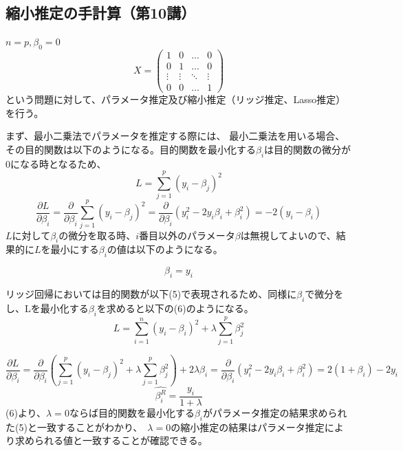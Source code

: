 \documentclass[uplatex]{jsarticle}
\begin{document}
\subsection{縮小推定の手計算（第10講）}
$n = p, \beta_0 = 0$
\[
  X = \left(
    \begin{array}{cccc}
      1 & 0 & \ldots & 0 \\
      0 & 1 & \ldots & 0 \\
      \vdots & \vdots & \ddots & \vdots \\
      0 & 0 & \ldots & 1
    \end{array}
  \right)
\]
という問題に対して、パラメータ推定及び縮小推定（リッジ推定、Lasso推定）を行う。

まず、最小二乗法でパラメータを推定する際には、
最小二乗法を用いる場合、その目的関数は以下のようになる。目的関数を最小化する$\beta_i$は目的関数の微分が0になる時となるため、
\begin{equation}
  L = \sum_{j = 1}^p(y_i - \beta_j)^2
\end{equation}
$$\frac{\partial L}{\partial \beta_i} = \frac{\partial}{\partial \beta_i}\sum_{j = 1}^p(y_i - \beta_j)^2 = \frac{\partial}{\partial \beta_i}(y_i^2 - 2y_i\beta_i + \beta_i^2) = -2(y_i - \beta_i)$$
$L$に対して$\beta_i$の微分を取る時、$i$番目以外のパラメータ$\beta$は無視してよいので、結果的に$L$を最小にする$\beta_i$の値は以下のようになる。

\begin{equation}
  \beta_i = y_i
\end{equation}

リッジ回帰においては目的関数が以下(5)で表現されるため、同様に$\beta_i$で微分をし、Lを最小化する$\beta_i$を求めると以下の(6)のようになる。
\begin{equation}
L = \sum_{i=1}^n \left(y_i - \beta_i \right)^2 + \lambda \sum_{j=1}^p \beta_j^2
\end{equation}

$$\frac{\partial L}{\partial \beta_i} = \frac{\partial}{\partial \beta_i}\left(\sum_{j = 1}^p(y_i - \beta_j)^2 +\lambda \sum_{j=1}^p \beta_j^2\right) + 2\lambda\beta_i = \frac{\partial}{\partial \beta_i}(y_i^2 - 2y_i\beta_i + \beta_i^2) = 2(1 + \beta_i) - 2y_i $$
\begin{equation}
  \hat{\beta_i^R} = \frac{y_i}{1 + \lambda}
\end{equation}
(6)より、$\lambda = 0$ならば目的関数を最小化する$\beta_i$がパラメータ推定の結果求められた(5)と一致することがわかり、\
$\lambda = 0$の縮小推定の結果はパラメータ推定により求められる値と一致することが確認できる。
\end{document}
